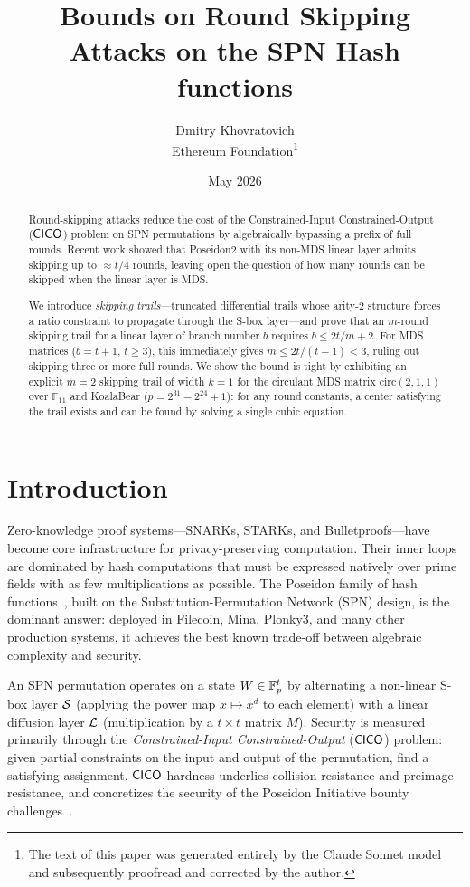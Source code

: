 \documentclass[11pt]{article}
\title{Bounds on Round Skipping Attacks on the SPN Hash functions}
\author{Dmitry Khovratovich\\\small Ethereum Foundation\thanks{The text of this paper was generated entirely by the Claude Sonnet model and subsequently proofread and corrected by the author.}}
\date{May 2026}
\begin{document}
\maketitle

\begin{abstract}
Round-skipping attacks reduce the cost of the Constrained-Input Constrained-Output ($\mathsf{CICO}$) problem on SPN permutations by algebraically bypassing a prefix of full rounds.
Recent work showed that Poseidon2 with its non-MDS linear layer admits skipping up to $\approx t/4$ rounds, leaving open the question of how many rounds can be skipped when the linear layer is MDS.

We introduce \emph{skipping trails}---truncated differential trails whose arity-2 structure forces a ratio constraint to propagate through the S-box layer---and prove that an $m$-round skipping trail for a linear layer of branch number $b$ requires $b \leq 2t/m + 2$.
For MDS matrices ($b = t+1$, $t \geq 3$), this immediately gives $m \leq 2t/(t-1) < 3$, ruling out skipping three or more full rounds.
We show the bound is tight by exhibiting an explicit $m = 2$ skipping trail of width $k = 1$ for the circulant MDS matrix $\mathrm{circ}(2,1,1)$ over $\mathbb{F}_{11}$ and KoalaBear ($p = 2^{31} - 2^{24} + 1$): for any round constants, a center satisfying the trail exists and can be found by solving a single cubic equation.
\end{abstract}

\section{Introduction}
\label{sec:intro}

Zero-knowledge proof systems---SNARKs, STARKs, and Bulletproofs---have become core infrastructure for privacy-preserving computation. Their inner loops are dominated by hash computations that must be expressed natively over prime fields with as few multiplications as possible. The Poseidon family of hash functions~\cite{poseidon,poseidon2}, built on the Substitution-Permutation Network (SPN) design, is the dominant answer: deployed in Filecoin, Mina, Plonky3, and many other production systems, it achieves the best known trade-off between algebraic complexity and security.

An SPN permutation operates on a state $W \in \mathbb{F}_p^t$ by alternating a non-linear S-box layer $\mathcal{S}$ (applying the power map $x \mapsto x^d$ to each element) with a linear diffusion layer $\mathcal{L}$ (multiplication by a $t \times t$ matrix $M$). Security is measured primarily through the \emph{Constrained-Input Constrained-Output} ($\mathsf{CICO}$) problem: given partial constraints on the input and output of the permutation, find a satisfying assignment. $\mathsf{CICO}$ hardness underlies collision resistance and preimage resistance, and concretizes the security of the Poseidon Initiative bounty challenges~\cite{poseidoninitiative}.
\end{document}
